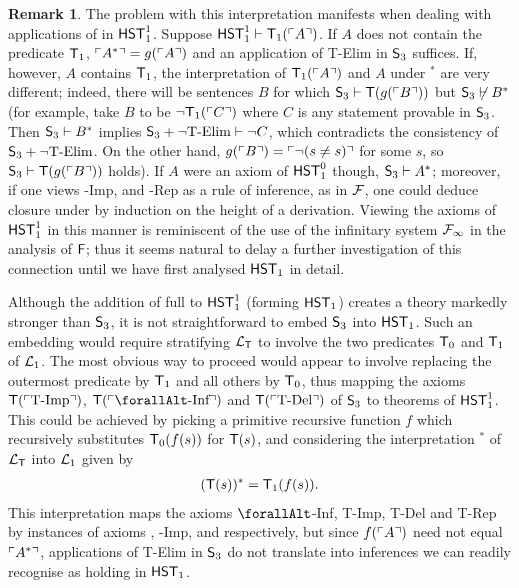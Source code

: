 \documentclass[UKenglish,cleveref,DIV=12]{scrartcl}
\let\forall\forallAlt
\theoremstyle{definition}
\theoremstyle{definition}
\newtheorem{remark}{Remark}
\begin{document}
\begin{remark}
The problem with this interpretation manifests when dealing with applications of
 in $\mathsf{HST}_1^1$. Suppose $\mathsf{HST}_1^1\vdash \mathsf{T}_1(\ulcorner{A}\urcorner)$. If $A$ does not
contain the predicate $\mathsf{T}_1$, $\ulcorner{A^*}\urcorner=g(\ulcorner{A}\urcorner)$ and an application of T-Elim
in $\mathsf{S}_3$ suffices. If, however, $A$ contains $\mathsf{T}_1$,
the interpretation of $\mathsf{T}_1(\ulcorner{A}\urcorner)$ and $A$ under $^*$ are very different;
indeed, there will be sentences $B$ for which $\mathsf{S}_3\vdash \mathsf{T}(g(\ulcorner{B}\urcorner))$
but $\mathsf{S}_3\not\vdash  B^*$ (for example, take $B$ to be $\lnot \mathsf{T}_1(\ulcorner{C}\urcorner)$ where $C$ is any statement provable in $\mathsf{S}_3$. Then $\mathsf{S}_3\vdash B^*$ implies $\mathsf{S}_3+\text{$\lnot$T-Elim}\vdash \lnot C$, which contradicts the consistency of $\mathsf{S}_3+\text{$\lnot$T-Elim}$. On the other hand, $g(\ulcorner{B}\urcorner)=\ulcorner{\lnot(s\neq s)}\urcorner$ for some $s$, so $\mathsf{S}_3\vdash \mathsf{T}(g(\ulcorner{B}\urcorner))$ holds).
If $A$ were an axiom of $\mathsf{HST}_1^0$ though, $\mathsf{S}_3\vdash A^*$; moreover, if one views -Imp,  and -Rep
as a rule of inference, as in $\mathcal{F}$, one could deduce
closure under  by induction on the height of a derivation. Viewing
the axioms of $\mathsf{HST}_1^1$ in this manner is
reminiscent of the use of the infinitary system $\mathcal{F}_\infty$ in the analysis of
$\mathsf{F}$; thus it seems natural to delay a further investigation of this connection
until we have first analysed $\mathsf{HST}_1$ in detail.

Although the addition of full  to $\mathsf{HST}_1^1$ (forming $\mathsf{HST}_1$) creates
a theory markedly stronger than $\mathsf{S}_3$, it is not straightforward to
embed $\mathsf{S}_3$ into $\mathsf{HST}_1$. Such an embedding would require stratifying
$\mathcal{L}_{\mathsf{T}}$ to involve the two predicates $\mathsf{T}_0$ and $\mathsf{T}_1$ of $\mathcal{L}_1$. The most obvious
way to proceed would appear to involve replacing the outermost predicate by
$\mathsf{T}_1$ and all others by $\mathsf{T}_0$, thus mapping the axioms $\mathsf{T}(\ulcorner{\text{T-Imp}}\urcorner)$,
$\T(\gn{\text{$\forall$-Inf}})$ and $\mathsf{T}(\ulcorner{\text{T-Del}}\urcorner)$ of $\mathsf{S}_3$ to
theorems of $\mathsf{HST}_1^1$. This could be achieved by picking a primitive recursive
function $f$ which recursively substitutes $\mathsf{T}_0(f(s))$ for $\mathsf{T}(s)$, and considering
the interpretation $^*$ of $\mathcal{L}_{\mathsf{T}}$ into $\mathcal{L}_1$ given by
\begin{align*}
 (\mathsf{T}(s))^*=\mathsf{T}_1(f(s)).
\end{align*}
This interpretation maps the axioms $\forall$-Inf, T-Imp, T-Del and
T-Rep by instances of axioms , -Imp,  and
 respectively, but since $f(\ulcorner{A}\urcorner)$ need not equal $\ulcorner{A^*}\urcorner$,
applications of T-Elim in $\mathsf{S}_3$ do not translate into inferences we can
readily recognise as holding in $\mathsf{HST}_1$.
\end{remark}
\end{document}

